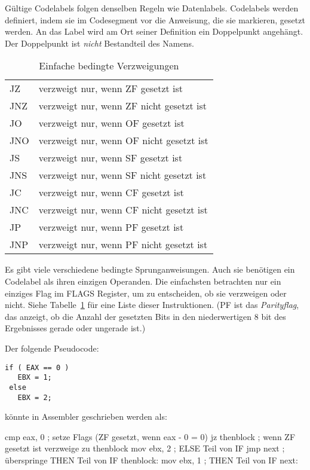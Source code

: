 G\"{u}ltige Codelabels folgen denselben Regeln wie Datenlabels.
Codelabels werden definiert, indem sie im Codesegment vor die
Anweisung, die sie markieren, gesetzt werden. An das Label wird am
Ort seiner Definition ein Doppelpunkt angeh\"{a}ngt. Der Doppelpunkt ist
\emph{nicht} Bestandteil des Namens. 
\begin{table}[ht]
\center
\begin{tabular}{|ll|}
\hline
 JZ  & verzweigt nur, wenn ZF gesetzt ist \\
 JNZ & verzweigt nur, wenn ZF nicht gesetzt ist \\
 JO  & verzweigt nur, wenn OF gesetzt ist \\
 JNO & verzweigt nur, wenn OF nicht gesetzt ist \\
 JS  & verzweigt nur, wenn SF gesetzt ist \\
 JNS & verzweigt nur, wenn SF nicht gesetzt ist \\
 JC  & verzweigt nur, wenn CF gesetzt ist \\
 JNC & verzweigt nur, wenn CF nicht gesetzt ist \\
 JP  & verzweigt nur, wenn PF gesetzt ist \\
 JNP & verzweigt nur, wenn PF nicht gesetzt ist \\
\hline
\end{tabular}
\caption{Einfache bedingte Verzweigungen \label{tab:SimpBran}
}
\end{table}

Es gibt viele verschiedene bedingte Sprunganweisungen. Auch sie
ben\"{o}tigen ein Codelabel als ihren einzigen Operanden. Die
einfachsten betrachten nur ein einziges Flag im FLAGS Register, um
zu entscheiden, ob sie verzweigen oder nicht. Siehe
Tabelle~\ref{tab:SimpBran} f\"{u}r eine Liste dieser Instruktionen. (PF
ist das \emph{ Parityflag},  das anzeigt,
ob die Anzahl der gesetzten Bits in den niederwertigen 8 bit des
Ergebnisses gerade oder ungerade ist.)

{\samepage Der folgende Pseudocode:
\begin{Verbatim}[numbers=none]
 if ( EAX == 0 )
   EBX = 1;
 else
   EBX = 2;
\end{Verbatim}
k\"{o}nnte in Assembler geschrieben werden als:}
\begin{AsmCodeListing}[frame=none, numbers=left, commandchars=\\\{\}]
      cmp    eax, 0           ; setze Flags (ZF gesetzt, wenn eax - 0 = 0)
      jz     thenblock        ; wenn ZF gesetzt ist verzweige zu thenblock
      mov    ebx, 2           ; ELSE Teil von IF
      jmp    next             ; \"{u}berspringe THEN Teil von IF
 thenblock:
      mov    ebx, 1           ; THEN Teil von IF
 next:
\end{AsmCodeListing}

